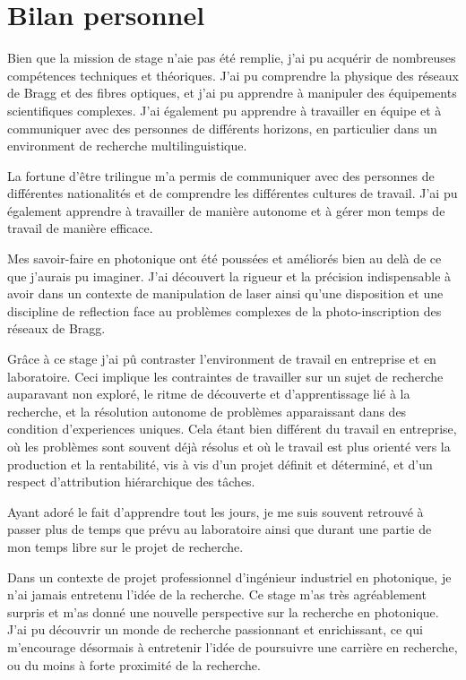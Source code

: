 \documentclass[11pt, openright]{book}
\begin{document}
     \section{Bilan personnel} 


     Bien que la mission de stage n'aie pas été remplie, j'ai pu acquérir de nombreuses compétences techniques et théoriques. J'ai pu comprendre la physique des réseaux de Bragg et des fibres optiques, et j'ai pu apprendre à manipuler des équipements scientifiques complexes. J'ai également pu apprendre à travailler en équipe et à communiquer avec des personnes de différents horizons, en particulier dans un environment de recherche multilinguistique.

     La fortune d'être trilingue m'a permis de communiquer avec des personnes de différentes nationalités et de comprendre les différentes cultures de travail. J'ai pu également apprendre à travailler de manière autonome et à gérer mon temps de travail de manière efficace. 

     Mes savoir-faire en photonique ont été poussées et améliorés bien au delà de ce que j'aurais pu imaginer. J'ai découvert la rigueur et la précision indispensable à avoir dans un contexte de manipulation de laser ainsi qu'une disposition et une discipline de reflection face au problèmes complexes de la photo-inscription des réseaux de Bragg.

     Grâce à ce stage j'ai pû contraster l'environment de travail en entreprise et en laboratoire. Ceci implique les contraintes de travailler sur un sujet de recherche auparavant non exploré, le ritme de découverte et d'apprentissage lié à la recherche, et la résolution autonome de problèmes apparaissant dans des condition d'experiences uniques. Cela étant bien différent du travail en entreprise, où les problèmes sont souvent déjà résolus et où le travail est plus orienté vers la production et la rentabilité, vis à vis d'un projet définit et déterminé, et d'un respect d'attribution hiérarchique des tâches.

     Ayant adoré le fait d'apprendre tout les jours, je me suis souvent retrouvé à passer plus de temps que prévu au laboratoire ainsi que durant une partie de mon temps libre sur le projet de recherche.

     Dans un contexte de projet professionnel d’ingénieur industriel en photonique, je n'ai jamais entretenu l'idée de la recherche. Ce stage m'as très agréablement surpris et m'as donné une nouvelle perspective sur la recherche en photonique. J'ai pu découvrir un monde de recherche passionnant et enrichissant, ce qui m'encourage désormais à entretenir l'idée de poursuivre une carrière en recherche, ou du moins à forte proximité de la recherche.
     
\end{document}
